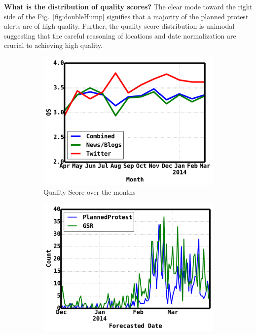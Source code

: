 \documentclass[letterpaper]{article}
\begin{document}
\vspace{-1em}
\noindent
{\bf What is the distribution of quality scores?}
The clear mode toward the right side of the Fig.~\ref{fig:doubleHump} signifies that a majority of the planned 
protest alerts are of high quality. Further, the quality score distribution is unimodal suggesting that the careful
reasoning of locations and date normalization are crucial to achieving high quality.
\begin{figure}
\begin{subfigure}{.70\columnwidth}
    \centering
  \includegraphics[scale=0.2]{monthlyqs}
  \vspace{-0.5em}
  \caption{\scriptsize Quality Score over the months}
  \label{fig:monthlyqs}
\end{subfigure}\hspace{.5pt}
\begin{subfigure}{.70\columnwidth}
    \centering
  \includegraphics[scale=0.2]{venezuela}

\end{subfigure}
\end{figure}
\end{document}
